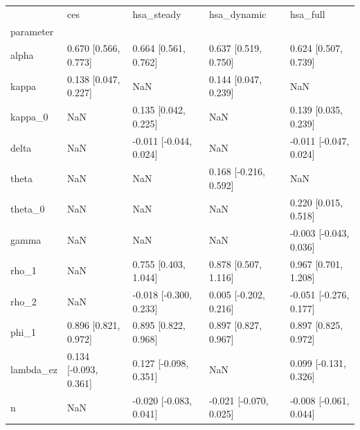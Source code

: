 \begin{tabular}{lllll}
\toprule
 & ces & hsa\_steady & hsa\_dynamic & hsa\_full \\
parameter &  &  &  &  \\
\midrule
alpha & 0.670 [0.566, 0.773] & 0.664 [0.561, 0.762] & 0.637 [0.519, 0.750] & 0.624 [0.507, 0.739] \\
kappa & 0.138 [0.047, 0.227] & NaN & 0.144 [0.047, 0.239] & NaN \\
kappa\_0 & NaN & 0.135 [0.042, 0.225] & NaN & 0.139 [0.035, 0.239] \\
delta & NaN & -0.011 [-0.044, 0.024] & NaN & -0.011 [-0.047, 0.024] \\
theta & NaN & NaN & 0.168 [-0.216, 0.592] & NaN \\
theta\_0 & NaN & NaN & NaN & 0.220 [0.015, 0.518] \\
gamma & NaN & NaN & NaN & -0.003 [-0.043, 0.036] \\
rho\_1 & NaN & 0.755 [0.403, 1.044] & 0.878 [0.507, 1.116] & 0.967 [0.701, 1.208] \\
rho\_2 & NaN & -0.018 [-0.300, 0.233] & 0.005 [-0.202, 0.216] & -0.051 [-0.276, 0.177] \\
phi\_1 & 0.896 [0.821, 0.972] & 0.895 [0.822, 0.968] & 0.897 [0.827, 0.967] & 0.897 [0.825, 0.972] \\
lambda\_ez & 0.134 [-0.093, 0.361] & 0.127 [-0.098, 0.351] & NaN & 0.099 [-0.131, 0.326] \\
n & NaN & -0.020 [-0.083, 0.041] & -0.021 [-0.070, 0.025] & -0.008 [-0.061, 0.044] \\
\bottomrule
\end{tabular}

